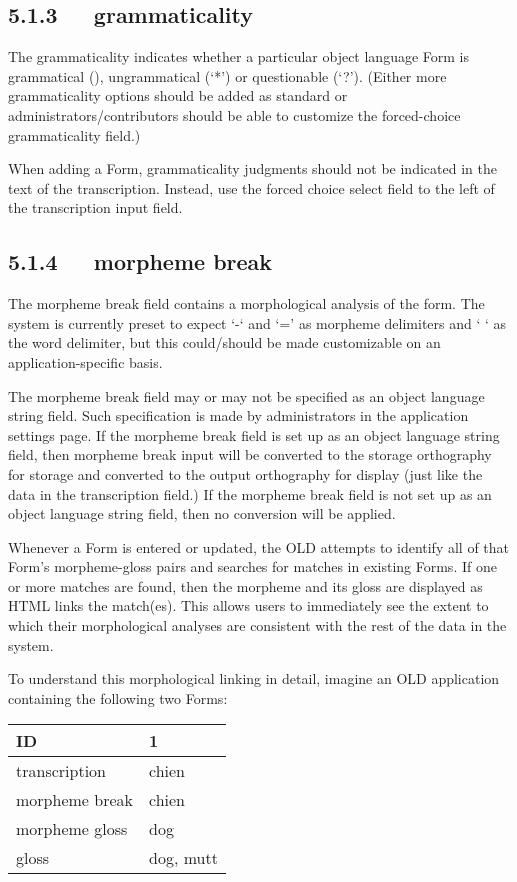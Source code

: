 \documentclass[letterpaper,10pt,english]{sphinxmanual}
\begin{document}
\subsection{5.1.3   grammaticality}
\label{documentation:grammaticality}
The grammaticality indicates whether a particular object language Form is
grammatical (), ungrammatical (`*') or questionable (`?').  (Either more
grammaticality options should be added as standard or
administrators/contributors should be able to customize the forced-choice
grammaticality field.)

When adding a Form, grammaticality judgments should not be indicated in the text
of the transcription.  Instead, use the forced choice select field to the left
of the transcription input field.


\subsection{5.1.4   morpheme break}
\label{documentation:morpheme-break}
The morpheme break field contains a morphological analysis of the form.  The
system is currently preset to expect `-` and `=' as morpheme delimiters and ` `
as the word delimiter, but this could/should be made customizable on an
application-specific basis.

The morpheme break field may or may not be specified as an object language
string field.  Such specification is made by administrators in the application
settings page.  If the morpheme break field is set up as an object language
string field, then morpheme break input will be converted to the storage
orthography for storage and converted to the output orthography for display
(just like the data in the transcription field.)  If the morpheme break field is
not set up as an object language string field, then no conversion will be
applied.

Whenever a Form is entered or updated, the OLD attempts to identify all of that
Form's morpheme-gloss pairs and searches for matches in existing Forms.  If one
or more matches are found, then the morpheme and its gloss are displayed as HTML
links the match(es).  This allows users to immediately see the extent to which
their morphological analyses are consistent with the rest of the data in the
system.

To understand this morphological linking in detail, imagine an OLD application
containing the following two Forms:

\begin{tabulary}{\linewidth}{|L|L|}
\hline

ID
 & 
1
\\\hline

transcription
 & 
chien
\\\hline

morpheme break
 & 
chien
\\\hline

morpheme gloss
 & 
dog
\\\hline

gloss
 & 
dog, mutt
\\\hline
\end{tabulary}
\end{document}
